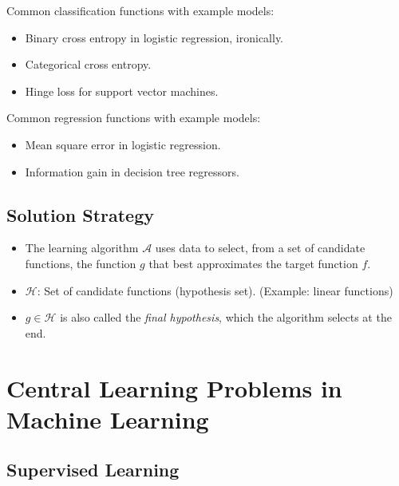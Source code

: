 Common classification functions with example models:

\begin{itemize}

	\item Binary cross entropy in logistic regression, ironically.

	\item Categorical cross entropy.

	\item Hinge loss for support vector machines.

\end{itemize}

Common regression functions with example models:

\begin{itemize}

	\item Mean square error in logistic regression.

	\item Information gain in decision tree regressors.

\end{itemize}

\subsection{Solution Strategy}

\begin{itemize}

	\item The learning algorithm \(\mathcal{A}\) uses data to select, from a set of candidate functions, the function \( g \) that best approximates the target function \(f\).

	\item \( \mathcal{H} \): Set of candidate functions (hypothesis set). (Example: linear functions)

	\item \( g \in \mathcal{H} \) is also called the \emph{final hypothesis}, which the algorithm selects at the end.

\end{itemize}

\section{Central Learning Problems in Machine Learning}

\subsection{Supervised Learning}

